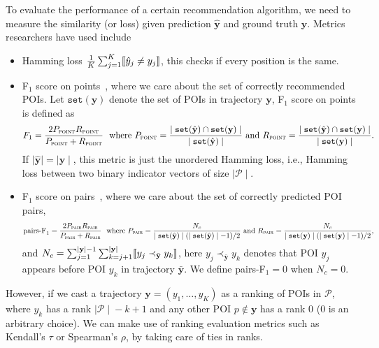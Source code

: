 To evaluate the performance of a certain recommendation algorithm,
we need to measure the similarity (or loss) given prediction $\hat{\mathbf{y}}$ and ground truth $\mathbf{y}$.
Metrics researchers have used include
\begin{itemize}
\item Hamming loss $\frac{1}{K} \sum_{j=1}^K \llbracket \hat{y}_j \neq y_j \rrbracket$, this checks if every position is the same.

\item F$_1$ score on points~\cite{ijcai15}, where we care about the set of correctly recommended POIs. 
      Let $\texttt{set}(\mathbf{y})$ denote the set of POIs in trajectory $\mathbf{y}$, F$_1$ score on points is defined as
\begin{equation*}
F_1 = \frac{2  P_{\textsc{point}}  R_{\textsc{point}}}{P_{\textsc{point}} + R_{\textsc{point}}} ~~\text{where}~
P_{\textsc{point}} = \frac{\mid \texttt{set}(\hat{\mathbf{y}}) \cap \texttt{set}(\mathbf{y}) \mid}{\mid \texttt{set}(\hat{\mathbf{y}}) \mid}~\text{and}~
R_{\textsc{point}} = \frac{\mid \texttt{set}(\hat{\mathbf{y}}) \cap \texttt{set}(\mathbf{y}) \mid}{\mid \texttt{set}(\mathbf{y}) \mid}.
\end{equation*}
If $\mid\!\! \hat{\mathbf{y}} \!\!\mid = \mid\!\! \mathbf{y} \!\!\mid$, this metric is just the unordered Hamming loss, 
i.e., Hamming loss between two binary indicator vectors of size $\mid\!\! \mathcal{P} \!\!\mid$.


\item F$_1$ score on pairs~\cite{cikm16paper}, where we care about the set of correctly predicted POI pairs,
\begin{equation*}
\text{pairs-F}_1 = \frac{2 P_{\textsc{pair}} R_{\textsc{pair}}}{P_{\textsc{pair}} + R_{\textsc{pair}}}~~\text{where}~
P_{\textsc{pair}} = \frac{N_c} {\mid \texttt{set}(\hat{\mathbf{y}}) \mid (\mid \texttt{set}(\hat{\mathbf{y}}) \mid - 1) / 2}~\text{and}~
R_{\textsc{pair}} = \frac{N_c} {\mid \texttt{set}(\mathbf{y}) \mid (\mid \texttt{set}(\mathbf{y}) \mid - 1) / 2},
\end{equation*}
and $N_c = \sum_{j=1}^{\mid \mathbf{y} \mid - 1} \sum_{k=j+1}^{\mid \mathbf{y} \mid} \llbracket y_j \prec_{\bar{\mathbf{y}}} y_k \rrbracket$,
here $y_j \prec_{\bar{\mathbf{y}}} y_k$ denotes that POI $y_j$ appears before POI $y_k$ in trajectory $\bar{\mathbf{y}}$.
We define pairs-F$_1 = 0$ when $N_c = 0$.

\end{itemize}

However, if we cast a trajectory $\mathbf{y} = (y_1,\dots,y_K)$ as a ranking of POIs in $\mathcal{P}$,
where $y_k$ has a rank $\mid\!\! \mathcal{P} \!\!\mid\! - k + 1$ and any other POI $p \notin \mathbf{y}$ has a rank $0$ ($0$ is an arbitrary choice).
We can make use of ranking evaluation metrics such as Kendall's $\tau$ or Spearman's $\rho$, by taking care of ties in ranks.


